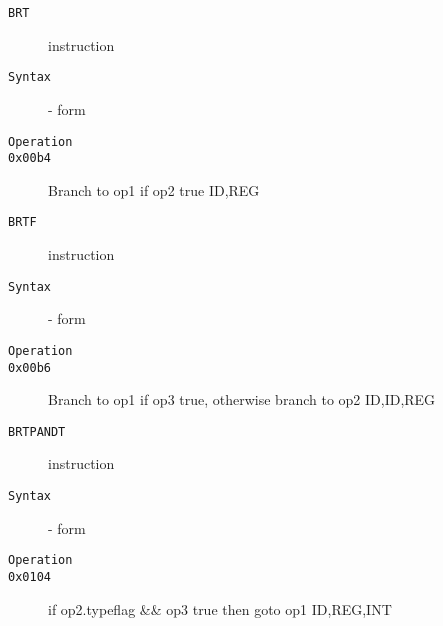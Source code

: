 \clearpage
\begin{description}
\item[\texttt{BRT}] instruction\\
\item[\texttt{Syntax}] - form \\

\item[\texttt{Operation}]
\item[\texttt{}]
\item[\texttt{0x00b4}] Branch to op1 if op2 true  {ID,REG}            \\
\end{description}
\clearpage
\begin{description}
\item[\texttt{BRTF}] instruction\\
\item[\texttt{Syntax}] - form \\

\item[\texttt{Operation}]
\item[\texttt{}]
\item[\texttt{0x00b6}] Branch to op1 if op3 true, otherwise branch to op2  {ID,ID,REG}         \\
\end{description}
\clearpage
\begin{description}
\item[\texttt{BRTPANDT}] instruction\\
\item[\texttt{Syntax}] - form \\

\item[\texttt{Operation}]
\item[\texttt{}]
\item[\texttt{0x0104}] if op2.typeflag \&\& op3 true then goto op1  {ID,REG,INT}        \\
\end{description}
